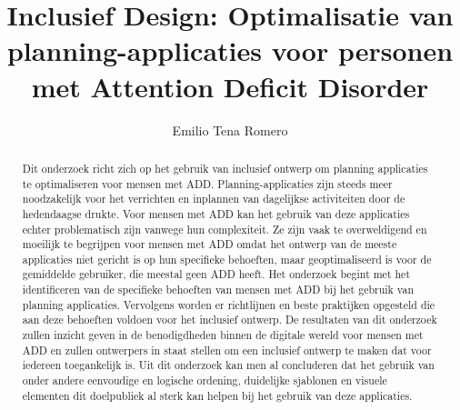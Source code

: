 \documentclass{hogent-article}
\title{Inclusief Design: Optimalisatie van planning-applicaties voor personen met Attention Deficit Disorder}
\author{Emilio Tena Romero}
\begin{document}
\begin{abstract}
  Dit onderzoek richt zich op het gebruik van inclusief ontwerp om planning applicaties te optimaliseren voor mensen met ADD. Planning-applicaties zijn steeds meer noodzakelijk voor het verrichten en inplannen van dagelijkse activiteiten door de hedendaagse drukte. Voor mensen met ADD kan het gebruik van deze applicaties echter problematisch zijn vanwege hun complexiteit. Ze zijn vaak te overweldigend en moeilijk te begrijpen voor mensen met ADD omdat het ontwerp van de meeste applicaties niet gericht is op hun specifieke behoeften, maar geoptimaliseerd is voor de gemiddelde gebruiker, die meestal geen ADD heeft. Het onderzoek begint met het identificeren van de specifieke behoeften van mensen met ADD bij het gebruik van planning applicaties. Vervolgens worden er richtlijnen en beste praktijken opgesteld die aan deze behoeften voldoen voor het inclusief ontwerp. De resultaten van dit onderzoek zullen inzicht geven in de benodigdheden binnen de digitale wereld voor mensen met ADD en zullen ontwerpers in staat stellen om een inclusief ontwerp te maken dat voor iedereen toegankelijk is. Uit dit onderzoek kan men al concluderen dat het gebruik van onder andere eenvoudige en logische ordening, duidelijke sjablonen en visuele elementen dit doelpubliek al sterk kan helpen bij het gebruik van deze applicaties.
\end{abstract}

\tableofcontents



\printbibliography[heading=bibintoc]
\end{document}
